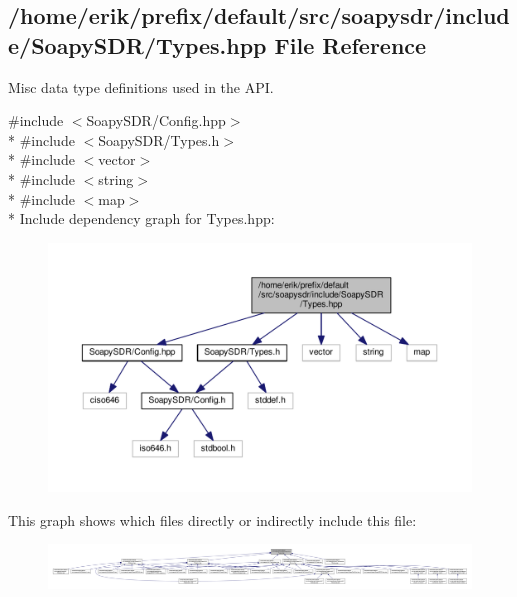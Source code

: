 \subsection{/home/erik/prefix/default/src/soapysdr/include/\+Soapy\+S\+D\+R/\+Types.hpp File Reference}
\label{Types_8hpp}


Misc data type definitions used in the A\+PI.  


{\ttfamily \#include $<$Soapy\+S\+D\+R/\+Config.\+hpp$>$}\\*
{\ttfamily \#include $<$Soapy\+S\+D\+R/\+Types.\+h$>$}\\*
{\ttfamily \#include $<$vector$>$}\\*
{\ttfamily \#include $<$string$>$}\\*
{\ttfamily \#include $<$map$>$}\\*
Include dependency graph for Types.\+hpp\+:
\nopagebreak
\begin{figure}[H]
\begin{center}
\leavevmode
\includegraphics[width=350pt]{d9/dd0/Types_8hpp__incl}
\end{center}
\end{figure}
This graph shows which files directly or indirectly include this file\+:
\nopagebreak
\begin{figure}[H]
\begin{center}
\leavevmode
\includegraphics[width=350pt]{d4/d7d/Types_8hpp__dep__incl}
\end{center}
\end{figure}

